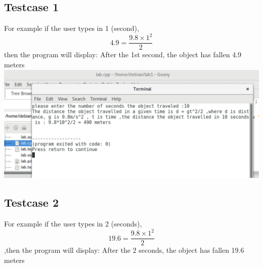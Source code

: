 \documentclass{article}
\begin{document}
\subsection*{Testcase 1}
For example if the user types in 1 (second),
\[ 4.9 = \frac{9.8 \times 1^{2}}{2} \]then the program will display:
After the 1st second, the object has fallen 4.9 meters
\newline
\includegraphics{lab1.png}
\subsection*{Testcase 2}
For example if the user types in 2 (seconds),
\[ 19.6 = \frac{9.8 \times 1^{2}}{2} \],then the program will display:
After the 2 seconds, the object has fallen 19.6 meters
\end{document}
